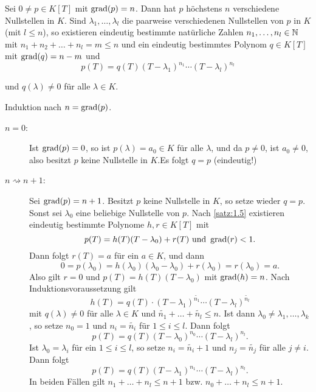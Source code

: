 \begin{satz}
	\label{satz:1.6}
	Sei $0 \neq p \in K[T]$ mit $\operatorname{grad}(p) = n$.
	Dann hat $p$ höchstens $n$ verschiedene Nullstellen in $K$.
	Sind $\lambda_1,\dots,\lambda_l$ die paarweise verschiedenen Nullstellen von $p$ in $K$ (mit $l \leq n$), so existieren eindeutig bestimmte natürliche Zahlen $n_1,\dots,n_l \in \mathbb{N}$ mit $n_1+n_2+\dots+n_l = m \leq n$ und ein eindeutig bestimmtes Polynom $q \in K[T]$ mit $\operatorname{grad}(q) = n-m$ und
	\begin{equation}
		p(T) = q(T)(T-\lambda_1)^{n_1} \cdots (T-\lambda_l)^{n_l} \label{eq:1.6.1}
	\end{equation}
		
	und $q(\lambda) \neq 0$ für alle $\lambda \in K$.
\end{satz}

\begin{beweis}
	Induktion nach $n = \operatorname{grad}(p)$.
	\begin{description}
		\item[$n=0$:] Ist $\operatorname{grad}(p) = 0$, so ist $p(\lambda) = a_0 \in K$ für alle $\lambda$, und da $p \neq 0$, ist $a_0 \neq 0$, also besitzt $p$ keine Nullstelle in $K$.Es folgt $q = p$ (eindeutig!)
		\item[$n \rightsquigarrow n+1$:] Sei $\operatorname{grad}(p) = n+1$.
		Besitzt $p$ keine Nullstelle in $K$, so setze wieder $q = p$.
		Sonst sei $\lambda_0$ eine beliebige Nullstelle von $p$.
		Nach \autoref{satz:1.5} existieren eindeutig bestimmte Polynome $h,r \in K[T]$ mit 
		\[
			p(T) = h(T)(T-\lambda_0) + r(T) \text{ und } \operatorname{grad}(r) < 1.
		\]
		Dann folgt $r(T) = a$ für ein $a \in K$, und dann
		\[
			0 = p(\lambda_0) = h(\lambda_0)(\lambda_0-\lambda_0) + r(\lambda_0) = r(\lambda_0) = a.
		\]
		Also gilt $r = 0$ und $p(T) = h(T)(T-\lambda_0)$ mit $\operatorname{grad}(h) = n$.
		Nach Induktionsvoraussetzung gilt
		\[
			h(T) = q(T)\cdot (T-\lambda_1)^{\widetilde{n_1}} \cdots (T-\lambda_l)^{\widetilde{n_l}}
		\]
		mit $q(\lambda) \neq 0$ für alle $\lambda \in K$ und $\widetilde{n_1} + \dots + \widetilde{n_l} \leq n$.
		Ist dann $\lambda_0 \neq \lambda_1,\dots,\lambda_k$, so setze $n_0 = 1$ und $n_i = \widetilde{n_i}$ für $1 \leq i \leq l$.
		Dann folgt
		\[
			p(T) = q(T)(T-\lambda_0)^{n_0} \cdots (T-\lambda_l)^{n_l}.
		\]
		Ist $\lambda_0 = \lambda_i$ für ein $1 \leq i \leq l$, so setze $n_i = \widetilde{n_i} + 1$ und $n_j = \widetilde{n_j}$ für alle $j \neq i$.
		Dann folgt
		\[
			p(T) = q(T)(T-\lambda_1)^{n_1} \cdots (T-\lambda_l)^{n_l}.
		\]
		In beiden Fällen gilt $n_1+\dots+n_l \leq n+1$ bzw. $n_0 + \dots + n_l \leq n+1$.
		

\end{description}
\end{beweis}
